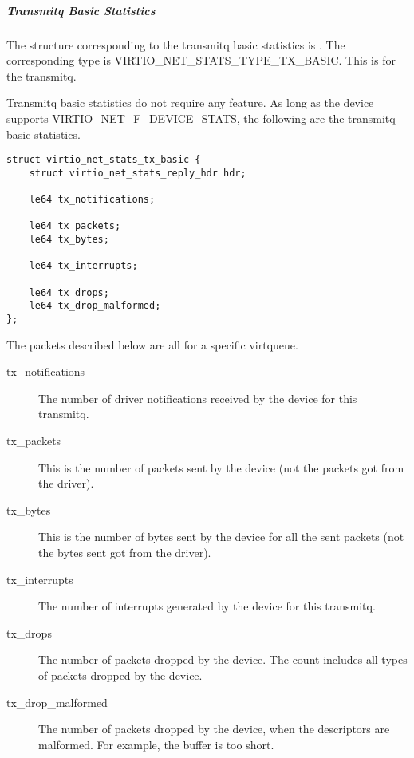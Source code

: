 \subparagraph{Transmitq Basic Statistics}\label{sec:Device Types / Network Device / Device Operation / Control Virtqueue / Device Statistics / Transmitq Basic Statistics}

The structure corresponding to the transmitq basic statistics is
. The corresponding type is
VIRTIO_NET_STATS_TYPE_TX_BASIC. This is for the transmitq.

Transmitq basic statistics do not require any feature. As long as the device supports
VIRTIO_NET_F_DEVICE_STATS, the following are the transmitq basic statistics.

\begin{lstlisting}
struct virtio_net_stats_tx_basic {
    struct virtio_net_stats_reply_hdr hdr;

    le64 tx_notifications;

    le64 tx_packets;
    le64 tx_bytes;

    le64 tx_interrupts;

    le64 tx_drops;
    le64 tx_drop_malformed;
};
\end{lstlisting}

The packets described below are all for a specific virtqueue.
\begin{description}
    \item [tx_notifications]
        The number of driver notifications received by the device for this
        transmitq.

    \item [tx_packets]
        This is the number of packets sent by the device (not the packets
        got from the driver).

    \item [tx_bytes]
        This is the number of bytes sent by the device for all the sent packets
        (not the bytes sent got from the driver).

    \item [tx_interrupts]
        The number of interrupts generated by the device for this transmitq.

    \item [tx_drops]
        The number of packets dropped by the device. The count includes all
        types of packets dropped by the device.

    \item [tx_drop_malformed]
        The number of packets dropped by the device, when the descriptors are
        malformed. For example, the buffer is too short.
\end{description}

